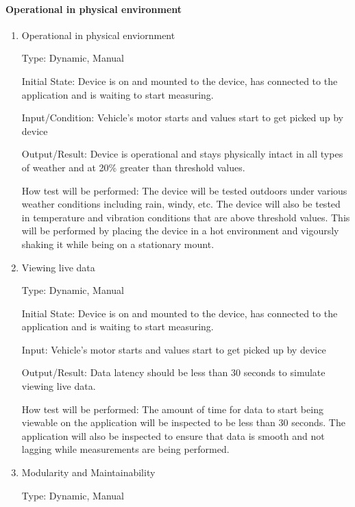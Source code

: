 \documentclass[12pt, titlepage]{article}
\begin{document}
\paragraph{Operational in physical environment}

\begin{enumerate}

\item{Operational in physical enviornment\\}

Type: Dynamic, Manual
					
Initial State: Device is on and mounted to the device, has connected to the application and is waiting to start measuring.
					
Input/Condition: Vehicle's motor starts and values start to get picked up by device
					
Output/Result: Device is operational and stays physically intact in all types of weather and at 20\% greater than threshold values.
					
How test will be performed: The device will be tested outdoors under various weather conditions including rain, windy, etc.
The device will also be tested in temperature and vibration conditions that are above threshold values. This will be performed by placing the device in a hot environment
and vigoursly shaking it while being on a stationary mount.
					
\item{Viewing live data\\}

Type: Dynamic, Manual
					
Initial State: Device is on and mounted to the device, has connected to the application and is waiting to start measuring.
					
Input: Vehicle's motor starts and values start to get picked up by device
					
Output/Result: Data latency should be less than 30 seconds to simulate viewing live data.
					
How test will be performed: The amount of time for data to start being viewable on the application will be inspected to be less than 30 seconds.
The application will also be inspected to ensure that data is smooth and not lagging while measurements are being performed.

\item{Modularity and Maintainability\\}

Type: Dynamic, Manual
					

\end{enumerate}
\end{document}
